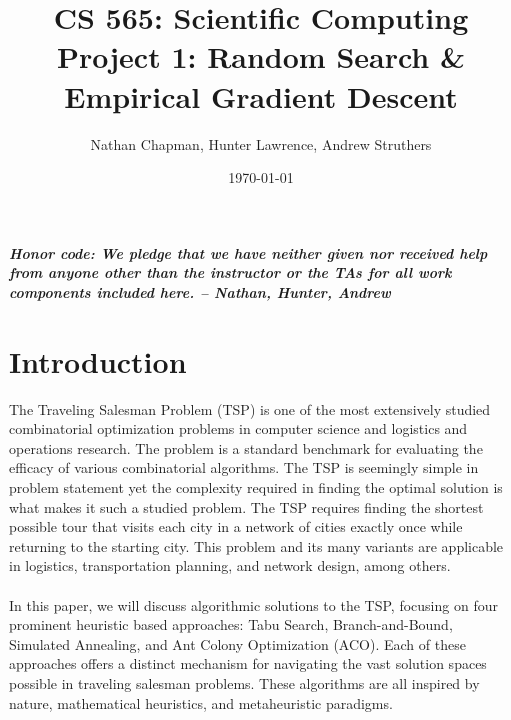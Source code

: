 \documentclass{article}
\title{\vspace*{-0.625in}CS 565: Scientific Computing \\ Project 1: Random Search \& Empirical Gradient Descent\vspace*{-0.25in}}
\author{Nathan Chapman, Hunter Lawrence, Andrew Struthers}
\date{\today}
\begin{document}
\maketitle
\tableofcontents
\pagebreak
\textbf{\textit{Honor code: We pledge that we have neither given nor received help from anyone other than the instructor or the TAs for all work components included here. -- Nathan, Hunter, Andrew}}

\section{Introduction}
The Traveling Salesman Problem (TSP) is one of the most extensively studied combinatorial optimization problems in computer science and logistics and operations research. The problem is a standard benchmark for evaluating the efficacy of various combinatorial algorithms. The TSP is seemingly simple in problem statement yet the complexity required in finding the optimal solution is what makes it such a studied problem. The TSP requires finding the shortest possible tour that visits each city in a network of cities exactly once while returning to the starting city. This problem and its many variants are applicable in logistics, transportation planning, and network design, among others.
\\\\
In this paper, we will discuss algorithmic solutions to the TSP, focusing on four prominent heuristic based approaches: Tabu Search, Branch-and-Bound, Simulated Annealing, and Ant Colony Optimization (ACO). Each of these approaches offers a distinct mechanism for navigating the vast solution spaces possible in traveling salesman problems. These algorithms are all inspired by nature, mathematical heuristics, and metaheuristic paradigms.
\end{document}
